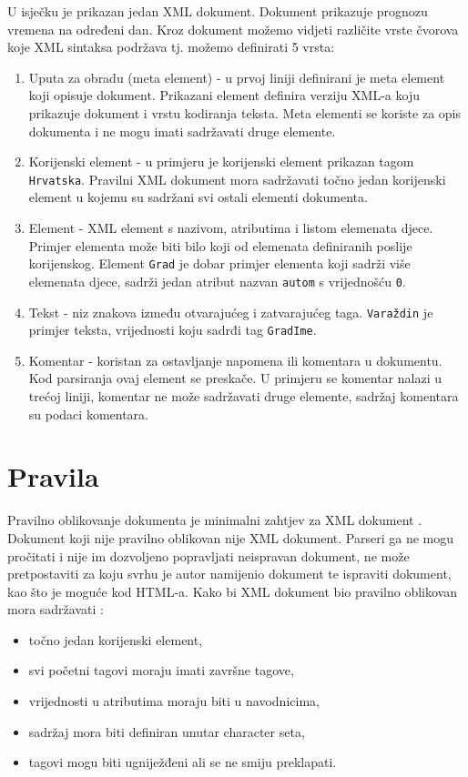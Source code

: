 \documentclass{foi}
\begin{document}
U isječku je prikazan jedan XML dokument. Dokument prikazuje prognozu vremena
na određeni dan. Kroz dokument možemo vidjeti različite vrste čvorova koje XML
sintaksa podržava tj. možemo definirati 5 vrsta:
\begin{enumerate}
	\item Uputa za obradu (meta element) - u prvoj liniji definirani je meta element koji
	      opisuje dokument. Prikazani element definira verziju XML-a koju prikazuje dokument
	      i vrstu kodiranja teksta. Meta elementi se koriste za opis dokumenta i ne mogu imati
	      sadržavati druge elemente.
	\item Korijenski element - u primjeru je korijenski element prikazan tagom \texttt{Hrvatska}.
	      Pravilni XML dokument mora sadržavati točno jedan korijenski element u kojemu su sadržani
	      svi ostali elementi dokumenta.
	\item Element - XML element s nazivom, atributima i listom elemenata djece. Primjer
	      elementa može biti bilo koji od elemenata definiranih poslije korijenskog. Element
	      \texttt{Grad} je dobar primjer elementa koji sadrži više elemenata djece, sadrži
	      jedan atribut nazvan \texttt{autom} s vrijednošću \texttt{0}.
	\item Tekst - niz znakova između otvarajućeg i zatvarajućeg taga. \texttt{Varaždin} je
	      primjer teksta, vrijednosti koju sadrđi tag \texttt{GradIme}.
	\item Komentar - koristan za ostavljanje napomena ili komentara u dokumentu. Kod parsiranja
	      ovaj element se preskače. U primjeru se komentar nalazi u trećoj liniji, komentar ne može
	      sadržavati druge elemente, sadržaj komentara su podaci komentara.
\end{enumerate}

\section{Pravila}
Pravilno oblikovanje dokumenta je minimalni zahtjev za XML dokument \cite{w3c_rec}.
Dokument koji nije pravilno oblikovan nije XML dokument. Parseri ga ne mogu pročitati i
nije im dozvoljeno popravljati neispravan dokument, ne može pretpostaviti za koju
svrhu je autor namijenio dokument te ispraviti dokument, kao što je moguće kod HTML-a.
Kako bi XML dokument bio pravilno oblikovan mora sadržavati \cite{process_xml}:
\begin{itemize}
	\item točno jedan korijenski element,
	\item svi početni tagovi moraju imati završne tagove,
	\item vrijednosti u atributima moraju biti u navodnicima,
	\item sadržaj mora biti definiran unutar character seta,
	\item tagovi mogu biti ugniježđeni ali se ne smiju preklapati.
\end{itemize}
\end{document}
